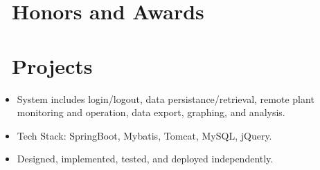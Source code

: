 \documentclass{resume}
\begin{document}
\section{\faHeartO\ Honors and Awards}

\section{\faFolderO\ Projects}
\begin{itemize}
  \item System includes login/logout, data persistance/retrieval, remote plant monitoring and operation, data export, graphing, and analysis.
  \item Tech Stack: SpringBoot, Mybatis, Tomcat, MySQL, jQuery.
  \item Designed, implemented, tested, and deployed independently.
\end{itemize}

%
%
\end{document}
